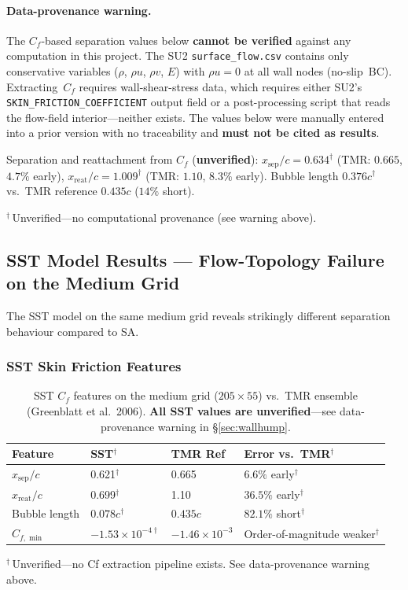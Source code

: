 \documentclass[11pt,a4paper]{article}
\begin{document}
\paragraph{Data-provenance warning.}
The $C_f$-based separation values below \textbf{cannot be verified}
against any computation in this project.  The SU2
\texttt{surface\_flow.csv} contains only conservative variables
($\rho$, $\rho u$, $\rho v$, $E$) with $\rho u = 0$ at all wall nodes
(no-slip~BC).  Extracting~$C_f$ requires wall-shear-stress data, which
requires either SU2's \texttt{SKIN\_FRICTION\_COEFFICIENT} output field or
a post-processing script that reads the flow-field interior---neither
exists.  The values below were manually entered into a prior version
with no traceability and \textbf{must not be cited as results}.

\medskip\noindent
Separation and reattachment from $C_f$ (\textbf{unverified}):
$x_\text{sep}/c = 0.634^\dagger$ (TMR: $0.665$, $4.7\%$ early),
$x_\text{reat}/c = 1.009^\dagger$ (TMR: $1.10$, $8.3\%$ early).
Bubble length $0.376c^\dagger$ vs.\ TMR reference $0.435c$
($14\%$ short).

\medskip\footnotesize $^\dagger$\,Unverified---no computational
provenance (see warning above).

\subsection{SST Model Results --- Flow-Topology Failure on the Medium Grid}

The SST model \cite{Menter1994} on the same medium grid reveals strikingly
different separation behaviour compared to SA.

\subsubsection{SST Skin Friction Features}

\begin{table}[!ht]
\centering
\caption{SST $C_f$ features on the medium grid ($205\times55$) vs.\ TMR
  ensemble (Greenblatt et al.\ 2006).%
  \newline\textbf{All SST values are unverified}---see data-provenance
  warning in \S\ref{sec:wallhump}.}
\label{tab:sst_cf}
\begin{tabular}{llll}
\toprule
\textbf{Feature} & \textbf{SST$^\dagger$} & \textbf{TMR Ref}
  & \textbf{Error vs.\ TMR$^\dagger$} \\
\midrule
$x_\text{sep}/c$   & 0.621$^\dagger$  & 0.665 & $6.6\%$ early$^\dagger$  \\
$x_\text{reat}/c$  & 0.699$^\dagger$  & 1.10  & $36.5\%$ early$^\dagger$ \\
Bubble length       & $0.078c^\dagger$ & $0.435c$ & $82.1\%$ short$^\dagger$ \\
$C_{f,\min}$        & $-1.53{\times}10^{-4\dagger}$ & $-1.46{\times}10^{-3}$
  & Order-of-magnitude weaker$^\dagger$ \\
\bottomrule
\end{tabular}

\medskip\footnotesize $^\dagger$\,Unverified---no Cf extraction
pipeline exists.  See data-provenance warning above.
\end{table}
\end{document}
